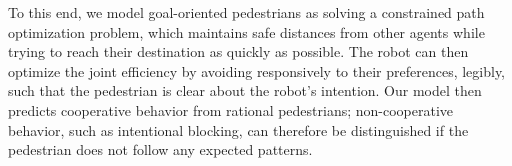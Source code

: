 \documentclass[conference]{IEEEtran}
\begin{document}


To this end, we model goal-oriented pedestrians as solving a constrained path optimization 
problem, which maintains safe distances from other agents while trying to reach
their destination as quickly as possible. 
The robot can 
then optimize the joint efficiency by avoiding responsively to their 
preferences, legibly, such that the pedestrian 
is clear about the robot's intention. Our model then predicts cooperative behavior from rational pedestrians; non-cooperative behavior, such as intentional blocking, can therefore be distinguished if the pedestrian does not follow any expected patterns.


\end{document}
